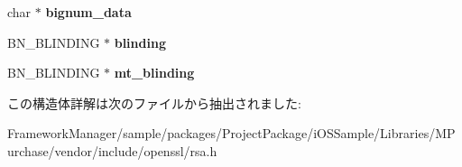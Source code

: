 \begin{DoxyCompactItemize}
\item 
\hypertarget{structrsa__st_afa45d273e5fccb2c8f806425aa7f8a4a}{}char $\ast$ {\bfseries bignum\+\_\+data}\label{structrsa__st_afa45d273e5fccb2c8f806425aa7f8a4a}

\item 
\hypertarget{structrsa__st_a953fd4cc8742674450f7a17841c5bcd5}{}B\+N\+\_\+\+B\+L\+I\+N\+D\+I\+N\+G $\ast$ {\bfseries blinding}\label{structrsa__st_a953fd4cc8742674450f7a17841c5bcd5}

\item 
\hypertarget{structrsa__st_a7e167b57f2c8af705b7519cc22458cba}{}B\+N\+\_\+\+B\+L\+I\+N\+D\+I\+N\+G $\ast$ {\bfseries mt\+\_\+blinding}\label{structrsa__st_a7e167b57f2c8af705b7519cc22458cba}

\end{DoxyCompactItemize}


この構造体詳解は次のファイルから抽出されました\+:\begin{DoxyCompactItemize}
\item 
Framework\+Manager/sample/packages/\+Project\+Package/i\+O\+S\+Sample/\+Libraries/\+M\+Purchase/vendor/include/openssl/rsa.\+h\end{DoxyCompactItemize}
